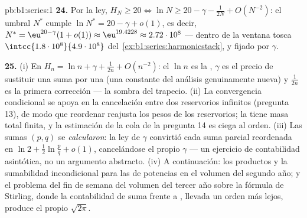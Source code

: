 \begin{solution}{pb:b1:series:1}
\textbf{24.} Por la ley,
$H_N \geq 20 \iff \ln N \geq 20 - \gamma - \frac{1}{2N} +
O(N^{-2})$: el umbral $N^*$ cumple $\ln N^* = 20 - \gamma + o(1)$, es
decir, $N^* = \eu^{20 - \gamma}(1 + o(1)) \approx \eu^{19.4228}
\approx 2.72\cdot10^{8}$ --- dentro de la ventana tosca
$\intcc{1.8\cdot10^8}{4.9\cdot10^8}$
del~\cref{ex:b1:series:harmonicstack}, y fijado por $\gamma$.

\textbf{25.} (i) En $H_n = \ln n + \gamma + \frac{1}{2n} +
O(n^{-2})$: el $\ln n$ es la , $\gamma$ es el precio de
sustituir una suma por una  (una constante del análisis
genuinamente nueva) y $\frac{1}{2n}$ es la primera corrección --- la
sombra del trapecio. (ii) La convergencia condicional se apoya en la
cancelación entre dos reservorios infinitos (pregunta 13), de modo
que reordenar reajusta los pesos de los reservorios; la
 tiene masa total finita, y la estimación de
la cola de la pregunta 14 es ciega al orden. (iii) Las sumas $(p,q)$
se \emph{calcularon}: la ley de $\gamma$ convirtió cada suma parcial
reordenada en $\ln 2 + \frac12\ln\frac pq + o(1)$, cancelándose el
propio $\gamma$ --- un ejercicio de contabilidad asintótica, no un
argumento abstracto. (iv) A continuación: los productos y la
sumabilidad incondicional para las  de potencias en el volumen
del segundo año; y el problema del fin de semana del volumen del
tercer año sobre la fórmula de Stirling, donde la contabilidad de
suma frente a , llevada un orden más lejos, produce el propio
$\sqrt{2\pi}$.
\end{solution}
